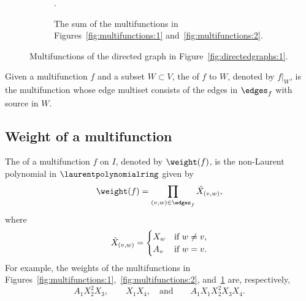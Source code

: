\begin{figure}[htpb]
    \hfill
    \begin{subfigure}[t]{0.29\textwidth}
        \centering
        .
        \caption{The sum of the multifunctions in Figures~\ref{fig:multifunctions:1} and~\ref{fig:multifunctions:2}.}
        \label{fig:multifunctions:3}
    \end{subfigure}
    \caption{Multifunctions of the directed graph in Figure~\ref{fig:directedgraphs:1}.}
    \label{fig:multifunctions}
\end{figure}

Given a multifunction \(f\) and a subset \(W \subset V\),
the  of \(f\) to \(W\), denoted by \(f|_{W}\), is the multifunction whose edge multiset consists of the edges in \(\edges_f\) with source in \(W\).

\subsection{Weight of a multifunction} \label{subsection:weightofamultifunction}

The  of a multifunction \(f\) on \(I\), denoted by \(\weight(f)\), is the non-Laurent polynomial in \(\laurentpolynomialring\) given by
\begin{equation*}
    \weight(f)
    = \prod_{(v, w) \in \edges_f} \Tilde{X}_{(v, w)},
\end{equation*}
where
\begin{equation*}
    \Tilde{X}_{(v, w)} = 
    \begin{cases}
    X_{w} & \text{if } w \neq v, \\
    A_{v} & \text{if } w = v.
    \end{cases}
\end{equation*}
For example,
the weights of the multifunctions in Figures~\ref{fig:multifunctions:1},~\ref{fig:multifunctions:2}, and~\ref{fig:multifunctions:3} are, respectively,
\begin{equation*}
    A_1 X_2^2 X_3,
    \qquad
    X_1 X_4,
    \quad
    \text{and}
    \qquad
    A_1 X_1 X_2^2 X_3 X_4.
\end{equation*}

